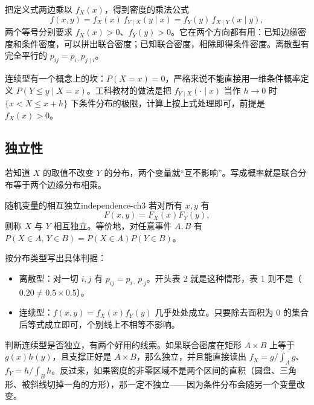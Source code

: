 把定义式两边乘以 $f_X(x)$，得到密度的乘法公式
\[
f(x,y)=f_X(x)\,f_{Y\mid X}(y\mid x)=f_Y(y)\,f_{X\mid Y}(x\mid y),
\]
两个等号分别要求 $f_X(x)>0$、$f_Y(y)>0$。它在两个方向都有用：已知边缘密度和条件密度，可以拼出联合密度；已知联合密度，相除即得条件密度。离散型有完全平行的 $p_{ij}=p_{i\cdot}p_{j\mid i}$。

连续型有一个概念上的坎：$P(X=x)=0$，严格来说不能直接用一维条件概率定义 $P(Y\le y\mid X=x)$。工科教材的做法是把 $f_{Y\mid X}(\cdot\mid x)$ 当作 $h\to0$ 时 $\{x<X\le x+h\}$ 下条件分布的极限，计算上按上式处理即可，前提是 $f_X(x)>0$。

\subsection{独立性}

若知道 $X$ 的取值不改变 $Y$ 的分布，两个变量就“互不影响”。写成概率就是联合分布等于两个边缘分布相乘。

\begin{mydef}{随机变量的相互独立}{independence-ch3}
若对所有 $x,y$ 有
\[
F(x,y)=F_X(x)F_Y(y),
\]
则称 $X$ 与 $Y$ 相互独立。等价地，对任意事件 $A,B$ 有 $P(X\in A,\,Y\in B)=P(X\in A)P(Y\in B)$。
\end{mydef}

按分布类型写出具体判据：
\begin{itemize}
\item 离散型：对一切 $i,j$ 有 $p_{ij}=p_{i\cdot}\,p_{\cdot j}$。开头表 2 就是这种情形，表 1 则不是（$0.20\ne0.5\times0.5$）。
\item 连续型：$f(x,y)=f_X(x)f_Y(y)$ 几乎处处成立。只要除去面积为 $0$ 的集合后等式成立即可，个别线上不相等不影响。
\end{itemize}

判断连续型是否独立，有两个好用的线索。如果联合密度在矩形 $A\times B$ 上等于 $g(x)h(y)$，且支撑正好是 $A\times B$，那么独立，并且能直接读出 $f_X=g/\int_A g$、$f_Y=h/\int_B h$。反过来，如果密度的非零区域不是两个区间的直积（圆盘、三角形、被斜线切掉一角的方形），那一定不独立——因为条件分布会随另一个变量改变。

